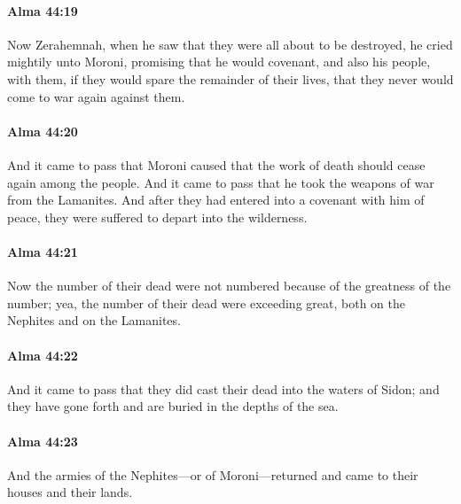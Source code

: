 		\paragraph{Alma 44:19} %
			\label{ALMA-44-19}

			Now Zerahemnah, when he saw that they were all about to be destroyed,
			he cried mightily unto Moroni,
			promising that he would covenant, and also his people, with them,
			if they would spare the remainder of their lives,
			that they never would come to war again against them.

		\paragraph{Alma 44:20} %
			\label{ALMA-44-20}

			And it came to pass that Moroni caused
			that the work of death should cease again among the people.
			And it came to pass that he took the weapons of war from the Lamanites.
			And after they had entered into a covenant with him of peace,
			they were suffered to depart into the wilderness.

		\paragraph{Alma 44:21} %
			\label{ALMA-44-21}

			Now the number of their dead were not numbered
			because of the greatness of the number;
			yea, the number of their dead were exceeding great,
			both on the Nephites and on the Lamanites.

		\paragraph{Alma 44:22} %
			\label{ALMA-44-22}

			And it came to pass that they did cast their dead into the waters of Sidon;
			and they have gone forth and are buried in the depths of the sea.

		\paragraph{Alma 44:23} %
			\label{ALMA-44-23}

			And the armies of the Nephites---or of Moroni---returned
			and came to their houses and their lands.

